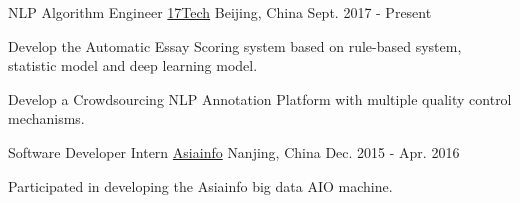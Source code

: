 

\begin{cventries}

  \cventry
    {NLP Algorithm Engineer} %
    {\href{https://www.17zuoye.com/help/aboutus.vpage}{17Tech}} %
    {Beijing, China} %
    {Sept. 2017 - Present} %
    {
      \begin{cvitems} %
        \item {Develop the Automatic Essay Scoring system based on rule-based system, statistic model and deep learning model.}
        \item {Develop a Crowdsourcing NLP Annotation Platform with multiple quality control mechanisms.}
      \end{cvitems}
    }

  \cventry
    {Software Developer Intern} %
    {\href{http://www.asiainfo.com}{Asiainfo}} %
    {Nanjing, China} %
    {Dec. 2015 - Apr. 2016} %
    {
      \begin{cvitems} %
        \item {Participated in developing the Asiainfo big data AIO machine.}
      \end{cvitems}
    }


\end{cventries}